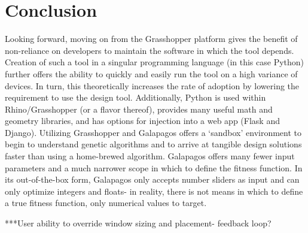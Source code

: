 \documentclass[sagev,doublespace,times,Review]{sagej}
\begin{document}
\section{Conclusion}
Looking forward, moving on from the Grasshopper platform gives the benefit of non-reliance on developers to maintain the software in which the tool depends. Creation of such a tool in a singular programming language (in this case Python) further offers the ability to quickly and easily run the tool on a high variance of devices. In turn, this theoretically increases the rate of adoption by lowering the requirement to use the design tool. Additionally, Python is used within Rhino/Grasshopper (or a flavor thereof), provides many useful math and geometry libraries, and has options for injection into a web app (Flask and Django).
Utilizing Grasshopper and Galapagos offers a ‘sandbox’ environment to begin to understand genetic algorithms and to arrive at tangible design solutions faster than using a home-brewed algorithm. Galapagos offers many fewer input parameters and a much narrower scope in which to define the fitness function. In its out-of-the-box form, Galapagos only accepts number sliders as input and can only optimize integers and floats- in reality, there is not means in which to define a true fitness function, only numerical values to target. 

***User ability to override window sizing and placement- feedback loop?



%
%
\end{document}
